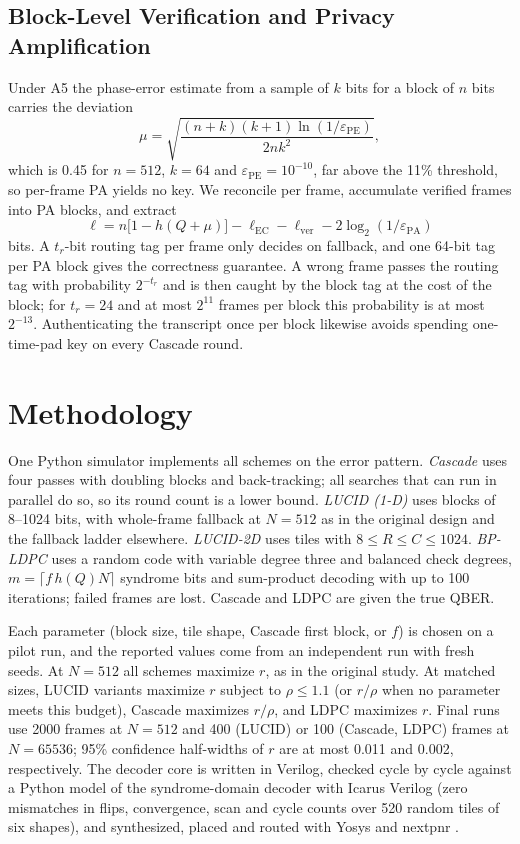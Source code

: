 \documentclass[conference]{IEEEtran}
\begin{document}
\subsection{Block-Level Verification and Privacy Amplification}\label{sec:block}
Under A5 the phase-error estimate from a sample of $k$ bits for a block of $n$ bits carries the deviation
\begin{equation}
\mu=\sqrt{\frac{(n+k)(k+1)\ln(1/\varepsilon_{\mathrm{PE}})}{2nk^{2}}},
\label{eq:mu}
\end{equation}
which is 0.45 for $n=512$, $k=64$ and $\varepsilon_{\mathrm{PE}}=10^{-10}$, far above the 11\% threshold, so per-frame PA yields no key. We reconcile per frame, accumulate verified frames into PA blocks, and extract
\begin{equation}
\ell=n\bigl[1-h(Q+\mu)\bigr]-\ell_{\mathrm{EC}}-\ell_{\mathrm{ver}}-2\log_2(1/\varepsilon_{\mathrm{PA}})
\label{eq:ell}
\end{equation}
bits. A $t_r$-bit routing tag per frame only decides on fallback, and one 64-bit tag per PA block gives the correctness guarantee. A wrong frame passes the routing tag with probability $2^{-t_r}$ and is then caught by the block tag at the cost of the block; for $t_r=24$ and at most $2^{11}$ frames per block this probability is at most $2^{-13}$. Authenticating the transcript once per block \cite{wegmancarter1981} likewise avoids spending one-time-pad key on every Cascade round.

\section{Methodology}\label{sec:method}
One Python simulator implements all schemes on the error pattern. \textit{Cascade} \cite{cascade} uses four passes with doubling blocks and back-tracking; all searches that can run in parallel do so, so its round count is a lower bound. \textit{LUCID (1-D)} uses blocks of 8--1024 bits, with whole-frame fallback at $N=512$ as in the original design and the fallback ladder elsewhere. \textit{LUCID-2D} uses tiles with $8\le R\le C\le1024$. \textit{BP-LDPC} uses a random code with variable degree three and balanced check degrees, $m=\lceil f\,h(Q)N\rceil$ syndrome bits and sum-product decoding with up to 100 iterations; failed frames are lost. Cascade and LDPC are given the true QBER.

Each parameter (block size, tile shape, Cascade first block, or $f$) is chosen on a pilot run, and the reported values come from an independent run with fresh seeds. At $N=512$ all schemes maximize $r$, as in the original study. At matched sizes, LUCID variants maximize $r$ subject to $\rho\le1.1$ (or $r/\rho$ when no parameter meets this budget), Cascade maximizes $r/\rho$, and LDPC maximizes $r$. Final runs use 2000 frames at $N=512$ and 400 (LUCID) or 100 (Cascade, LDPC) frames at $N=65536$; 95\% confidence half-widths of $r$ are at most 0.011 and 0.002, respectively. The decoder core is written in Verilog, checked cycle by cycle against a Python model of the syndrome-domain decoder with Icarus Verilog (zero mismatches in flips, convergence, scan and cycle counts over 520 random tiles of six shapes), and synthesized, placed and routed with Yosys and nextpnr \cite{shah2019}.
\end{document}
